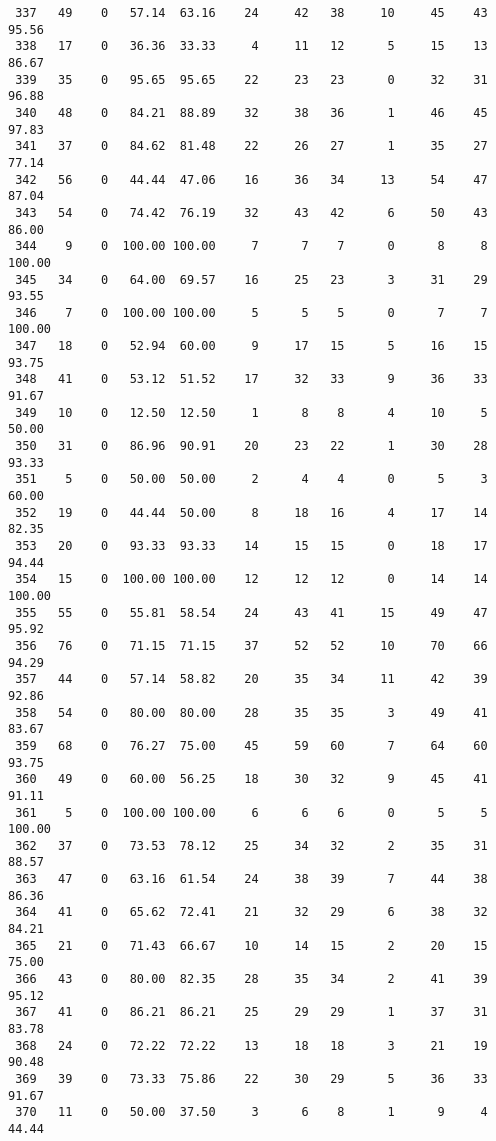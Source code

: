 \begin{verbatim}
 337   49    0   57.14  63.16    24     42   38     10     45    43    95.56
 338   17    0   36.36  33.33     4     11   12      5     15    13    86.67
 339   35    0   95.65  95.65    22     23   23      0     32    31    96.88
 340   48    0   84.21  88.89    32     38   36      1     46    45    97.83
 341   37    0   84.62  81.48    22     26   27      1     35    27    77.14
 342   56    0   44.44  47.06    16     36   34     13     54    47    87.04
 343   54    0   74.42  76.19    32     43   42      6     50    43    86.00
 344    9    0  100.00 100.00     7      7    7      0      8     8   100.00
 345   34    0   64.00  69.57    16     25   23      3     31    29    93.55
 346    7    0  100.00 100.00     5      5    5      0      7     7   100.00
 347   18    0   52.94  60.00     9     17   15      5     16    15    93.75
 348   41    0   53.12  51.52    17     32   33      9     36    33    91.67
 349   10    0   12.50  12.50     1      8    8      4     10     5    50.00
 350   31    0   86.96  90.91    20     23   22      1     30    28    93.33
 351    5    0   50.00  50.00     2      4    4      0      5     3    60.00
 352   19    0   44.44  50.00     8     18   16      4     17    14    82.35
 353   20    0   93.33  93.33    14     15   15      0     18    17    94.44
 354   15    0  100.00 100.00    12     12   12      0     14    14   100.00
 355   55    0   55.81  58.54    24     43   41     15     49    47    95.92
 356   76    0   71.15  71.15    37     52   52     10     70    66    94.29
 357   44    0   57.14  58.82    20     35   34     11     42    39    92.86
 358   54    0   80.00  80.00    28     35   35      3     49    41    83.67
 359   68    0   76.27  75.00    45     59   60      7     64    60    93.75
 360   49    0   60.00  56.25    18     30   32      9     45    41    91.11
 361    5    0  100.00 100.00     6      6    6      0      5     5   100.00
 362   37    0   73.53  78.12    25     34   32      2     35    31    88.57
 363   47    0   63.16  61.54    24     38   39      7     44    38    86.36
 364   41    0   65.62  72.41    21     32   29      6     38    32    84.21
 365   21    0   71.43  66.67    10     14   15      2     20    15    75.00
 366   43    0   80.00  82.35    28     35   34      2     41    39    95.12
 367   41    0   86.21  86.21    25     29   29      1     37    31    83.78
 368   24    0   72.22  72.22    13     18   18      3     21    19    90.48
 369   39    0   73.33  75.86    22     30   29      5     36    33    91.67
 370   11    0   50.00  37.50     3      6    8      1      9     4    44.44

\end{verbatim}
